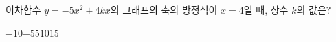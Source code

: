 \hspace*{2mm}\begin{minipage}[t]{\dimexpr\linewidth-2mm\relax}\vspace{0pt}
이차함수 $y=-5x^2+4kx$의 그래프의 축의 방정식이 $x=4$일 때, 상수 $k$의 값은?
\begin{choices32}{$-10$}{$-5$}{$5$}{$10$}{$15$}\end{choices32}\end{minipage}

